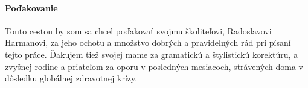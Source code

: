 

\vfill
\thispagestyle{empty}
\paragraph{Poďakovanie}

Touto cestou by som sa chcel poďakovať svojmu školiteľovi, Radoslavovi Harmanovi, za jeho ochotu a množstvo dobrých a pravidelných rád pri písaní tejto práce.
Ďakujem tiež svojej mame za gramatickú a štylistickú korektúru, a zvyšnej rodine a priateľom za oporu v posledných mesiacoch, strávených doma v dôsledku globálnej zdravotnej krízy.
